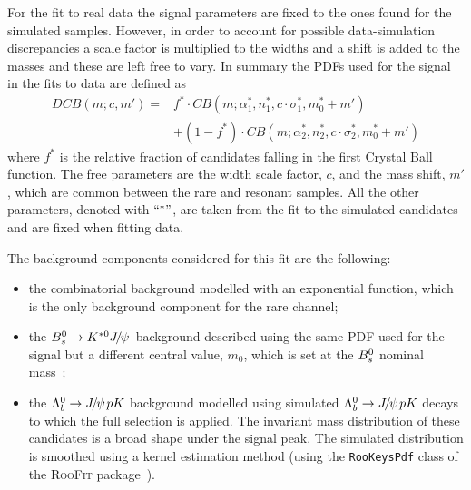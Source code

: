 For the fit to real data the signal parameters are fixed to the ones found for the simulated samples.
However, in order to account for possible data-simulation discrepancies a scale factor is multiplied to the widths
and a shift is added to the masses and these are left free to vary. In summary the PDFs used for the signal 
in the fits to data are defined as
%
\begin{equation}
\label{eq:DCB_RKst}
\begin{array} {ll}
DCB(m;c,m') = & f^{*} \cdot CB(m;\alpha_1^{*},n_1^{*},c \cdot \sigma_1^{*}, m_0^{*} + m') \\
&+ (1 - f^{*}) \cdot CB(m;\alpha_2^{*},n_2^{*},c \cdot \sigma_2^{*}, m_0^{*} + m')
\end{array}
\end{equation}  
%
where $f^{*}$ is the relative fraction of candidates falling in the first Crystal Ball function.
The free parameters are the width scale factor, $c$, and the mass shift, $m'$, which are common between
the rare and resonant samples. All the other parameters, denoted with $``^*"$, are taken from the fit to the
simulated candidates 
and are fixed when fitting data.

The background components considered for this fit are the following:
\begin{itemize}
\item the combinatorial background modelled with an exponential function,
which is the only background component for the rare channel;
\item 
the $\Bs\to\Kstarz\jpsi$ background described using the same PDF used for the signal but a different
central value, $m_{0}$, which is set at the ${{B}^0_{s}}$ nominal mass~\cite{PDG2014};
\item the $\Lb\to\jpsi pK$ background modelled using simulated \mbox{$\Lb\to\jpsi pK$} decays
to which the full selection is applied. The invariant mass distribution
of these candidates is a broad shape under the signal peak. The simulated distribution 
is smoothed using a kernel estimation method (using the \verb!RooKeysPdf! class of
the \textsc{RooFit} package~\cite{Verkerke:2003ir}).
\end{itemize}

